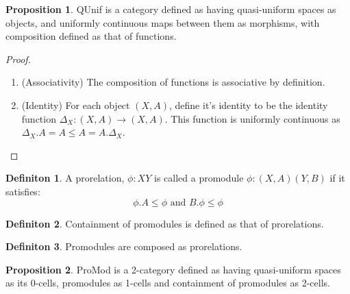 \documentclass[18pt,a4paper]{article}
\makeatletter
\theoremstyle{definition}
\newtheorem{definition}{Definiton}[section]
\newtheorem{proop}{Proposition}[section]
\newcommand{\carrow}{}%
\DeclareRobustCommand{\carrow}{%
	\mathrel{\vphantom{\rightarrow}\mathpalette\circle@arrow\relax}%
}
\newcommand{\circle@arrow}[2]{%
	\m@th
	\ooalign{%
		\hidewidth$#1\circ\mkern1mu$\hidewidth\cr
	$#1\longrightarrow$\cr}%
}
\makeatother
\begin{document}
\begin{proop} QUnif is a category defined as having quasi-uniform spaces as objects,
	and uniformly continuous maps between them as morphisms, with composition defined as that of functions.
\end{proop}
\begin{proof}
	\begin{enumerate}[label=(\roman*)]
		\item (Associativity) The composition of functions is associative by definition.
		\item (Identity) For each object $(X,A)$, define it's identity to be the identity
			function $\Delta_X:(X,A) \to (X,A)$.
			This function is uniformly continuous as $\Delta_X.A=A \leq A=A.\Delta_X$.
	\end{enumerate}
\end{proof}
\begin{definition}%
	A prorelation, $\phi:X \carrow Y$ is called a promodule $\phi: (X,A) \carrow (Y,B)$  if it
	satisfies:
	\[ \phi.A \leq \phi \text{ and } B. \phi \leq \phi \]
\end{definition}
\begin{definition} %
	Containment of promodules is defined as that of prorelations.
\end{definition}
\begin{definition} %
	Promodules are composed as prorelations.\\
\end{definition}
\begin{proop}%
	ProMod is a 2-category defined as having quasi-uniform spaces as its 0-cells,
	promodules as 1-cells and containment of promodules as 2-cells.
\end{proop}
\end{document}
